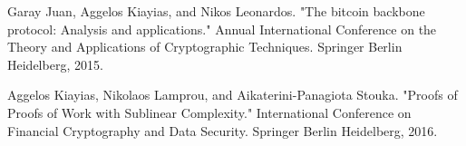 \begin{thebibliography}{2}
        Garay Juan, Aggelos Kiayias, and Nikos Leonardos. "The bitcoin
        backbone protocol: Analysis and applications." Annual International
        Conference on the Theory and Applications of Cryptographic Techniques.
        Springer Berlin Heidelberg, 2015.

        Aggelos Kiayias, Nikolaos Lamprou, and Aikaterini-Panagiota Stouka.
        "Proofs of Proofs of Work with Sublinear Complexity." International
        Conference on Financial Cryptography and Data Security. Springer Berlin
        Heidelberg, 2016.

\end{thebibliography}
